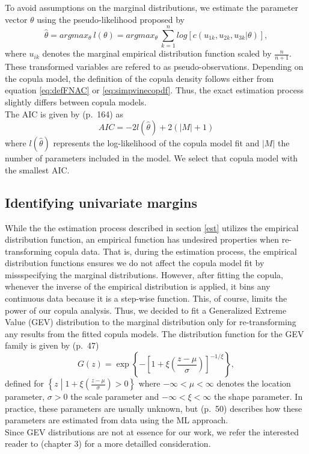 \documentclass[
]{krantz}
\begin{document}
To avoid assumptions on the marginal distributions,
we estimate the parameter vector \(\theta\) using the pseudo-likelihood proposed by \citet{genest1995}\\
\[
\hat{\theta} = argmax_\theta\ l(\theta) = argmax_\theta\ \sum_{k = 1}^{n}log[c(u_{1k}, u_{2k}, u_{3k}|\theta)],
\label{eq:pseudologlik}
\]
where \(u_{ik}\) denotes the marginal empirical distribution function scaled by \(\frac{n}{n+1}\).
These transformed variables are refered to as pseudo-observations.
Depending on the copula model, the definition of the copula density follows either from
equation \eqref{eq:defFNAC} or \eqref{eq:simpvinecopdf}.
Thus, the exact estimation process slightly differs between copula models.\\
The AIC is given by \citet{fahrmeir2013} (p.~164) as\\
\[
AIC = -2 l(\hat{\theta}) + 2 (|M| + 1)
\label{eq:AIC}
\]
where \(l(\hat{\theta})\) represents the log-likelihood of the copula model fit and \(|M|\) the number of parameters included in the model.
We select that copula model with the smallest AIC.

\subsection{Identifying univariate margins}\label{gev}

While the the estimation process described in section \ref{est} utilizes the
empirical distribution function, an empirical function has undesired properties when re-transforming copula data.
That is, during the estimation process, the empirical distribution functions ensures we
do not affect the copula model fit by missspecifying the marginal distributions.
However, after fitting the copula, whenever the inverse of the empirical distribution is applied, it bins any continuous data because it is a step-wise function. This, of course, limits the power of our copula analysis.
Thus, we decided to fit a Generalized Extreme Value (GEV) distribution to the marginal distribution only for re-transforming any results from the fitted copula models.
The distribution function for the GEV family is given by \citet{coles2001} (p.~47)\\
\[
G(z) = \exp\left\{ -\left[ 1 + \xi \left( \frac{z - \mu}{\sigma} \right) \right]^{-1/\xi} \right\},
\]
defined for \(\left\{ z \middle| 1 + \xi \left(\frac{z - \mu}{\sigma}\right) > 0 \right\}\) where
\(-\infty < \mu < \infty\) denotes the location parameter,
\(\sigma > 0\) the scale parameter and
\(-\infty < \xi < \infty\) the shape parameter.
In practice, these parameters are usually unknown, but \citet{coles2001} (p.~50) describes how these parameters are estimated from data using the ML approach.\\
Since GEV distributions are not at essence for our work, we refer the interested reader to \citet{coles2001} (chapter 3)
for a more detailled consideration.
\end{document}
